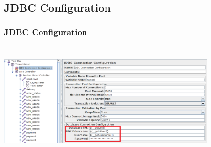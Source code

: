 \documentclass[12pt]{beamer}
\begin{document}
\subsection{JDBC Configuration}
\begin{frame}[c]
\frametitle{JDBC Configuration}
\centering
   \includegraphics[width=11cm, height=6cm]{images/jdbcconfig}

\end{frame}

\end{document}
